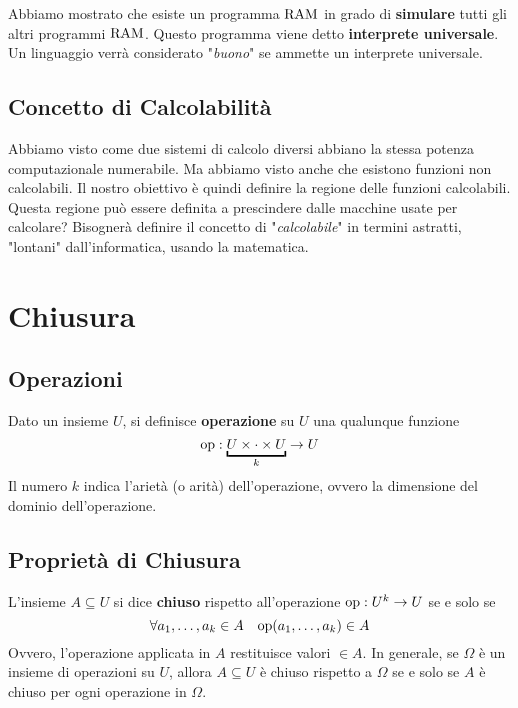 Abbiamo mostrato che esiste un programma $\text{RAM}$ in grado di \textbf{simulare} tutti gli altri programmi $\text{RAM}$. Questo programma viene detto \textbf{interprete universale}.\\

Un linguaggio verrà considerato "\textit{buono}" se ammette un interprete universale.\\

\subsection{Concetto di Calcolabilità}

Abbiamo visto come due sistemi di calcolo diversi abbiano la stessa potenza computazionale numerabile. Ma abbiamo visto anche che esistono funzioni non calcolabili. Il nostro obiettivo è quindi definire la regione delle funzioni calcolabili.\\

Questa regione può essere definita a prescindere dalle macchine usate per calcolare? Bisognerà definire il concetto di "\textit{calcolabile}" in termini astratti, "lontani" dall'informatica, usando la matematica.\\

\section{Chiusura}
\subsection{Operazioni}
Dato un insieme $U$, si definisce \textbf{operazione} su $U$ una qualunque funzione
$$ \op: \underbracket{U \times \cdot \times U}_k \rightarrow U $$
Il numero $k$ indica l'arietà (o arità) dell'operazione, ovvero la dimensione del dominio dell'operazione.\\

\subsection{Proprietà di Chiusura}
L'insieme $A \subseteq U$ si dice \textbf{chiuso} rispetto all'operazione $\operatorname{op} : U^k \rightarrow U$ se e solo se
$$ \forall a_1, \dots, a_k \in A \;\;\; \operatorname{op}(a_1, \dots, a_k) \in A $$
Ovvero, l'operazione applicata in $A$ restituisce valori $\in A$. In generale, se $\Omega$ è un insieme di operazioni su $U$, allora $A \subseteq U$ è chiuso rispetto a $\Omega$ se e solo se $A$ è chiuso per ogni operazione in $\Omega$.\\

